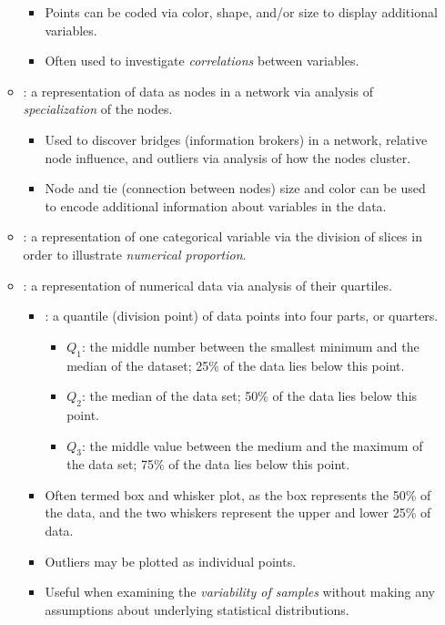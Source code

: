 \begin{itemize}
\begin{itemize}
      \begin{itemize}
        \item Points can be coded via color, shape, and/or size to display additional variables.
        \item Often used to investigate \emph{correlations} between variables.
      \end{itemize}
    \item {}: a representation of data as nodes in a network via analysis of \emph{specialization} of the nodes.
      \begin{itemize}
        \item Used to discover bridges (information brokers) in a network, relative node influence, and outliers via analysis of how the nodes cluster.
        \item Node and tie (connection between nodes) size and color can be used to encode additional information about variables in the data.
      \end{itemize}
    \item {}: a representation of one categorical variable via the division of slices in order to illustrate \emph{numerical proportion}.
    \item {}: a representation of numerical data via analysis of their quartiles.
      \begin{itemize}
        \item {}: a quantile (division point) of data points into four parts, or quarters. 
          \begin{itemize}
            \item \(Q_1\): the middle number between the smallest minimum and the median of the dataset; 25\% of the data lies below this point.
            \item \(Q_2\): the median of the data set; 50\% of the data lies below this point.
            \item \(Q_3\): the middle value between the medium and the maximum of the data set; 75\% of the data lies below this point.
          \end{itemize}
        \item Often termed box and whisker plot, as the box represents the 50\% of the data, and the two whiskers represent the upper and lower 25\% of data.
        \item Outliers may be plotted as individual points.
        \item Useful when examining the \emph{variability of samples} without making any assumptions about underlying statistical distributions.
      \end{itemize}
  \end{itemize}
  
\end{itemize}

